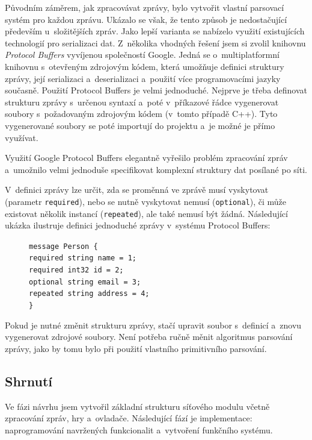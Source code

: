\documentclass[thesis=B,czech,hidelinks]{FITthesis}[2012/06/26] %
\newcommand{\code}[1]{\texttt{#1}}
\newcommand\tab[1][1cm]{\hspace*{#1}}
\begin{document}
Původním záměrem, jak zpracovávat zprávy, bylo vytvořit vlastní parsovací systém pro každou zprávu. Ukázalo se však, že tento způsob je nedostačující především u~složitějších zpráv. Jako lepší varianta se nabízelo využití existujících technologií pro serializaci dat. Z~několika vhodných řešení jsem si zvolil knihovnu \textit{Protocol Buffers} vyvíjenou společností Google. Jedná se o~multiplatformní knihovnu s~otevřeným zdrojovým kódem, která umožňuje definici struktury zprávy, její serializaci a~deserializaci a~použití více programovacími jazyky současně. \cite{protobuf} Použití Protocol Buffers je velmi jednoduché. Nejprve je třeba definovat strukturu zprávy s~určenou syntaxí a~poté v~příkazové řádce vygenerovat soubory s~požadovaným zdrojovým kódem (v~tomto případě C++). Tyto vygenerované soubory se poté importují do projektu a~je možné je přímo využívat.

Využití Google Protocol Buffers elegantně vyřešilo problém zpracování zpráv a~umožnilo velmi jednoduše specifikovat komplexní struktury dat posílané po síti.

V~definici zprávy lze určit, zda se proměnná ve zprávě musí vyskytovat (parametr \code{required}), nebo se nutně vyskytovat nemusí (\code{optional}), či může existovat několik instancí (\code{repeated}), ale také nemusí být žádná. Následující ukázka ilustruje definici jednoduché zprávy v~systému Protocol Buffers:

\begin{figure}[h]
\code{message Person \{ \\
\tab required string name = 1; \\
\tab required int32 id = 2; \\
\tab optional string email = 3; \\
\tab repeated string address = 4; \\
\}}
\end{figure}

Pokud je nutné změnit strukturu zprávy, stačí upravit soubor s~definicí a~znovu vygenerovat zdrojové soubory. Není potřeba ručně měnit algoritmus parsování zprávy, jako by tomu bylo při použití vlastního primitivního parsování.

\subsection{Shrnutí}

Ve fázi návrhu jsem vytvořil základní strukturu síťového modulu včetně zpracování zpráv, hry a~ovladače. Následující fází je implementace: naprogramování navržených funkcionalit a~vytvoření funkčního systému.
\end{document}
